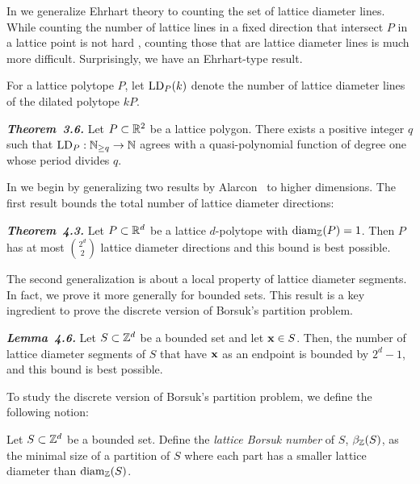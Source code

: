 In  we generalize Ehrhart theory to counting the set of lattice diameter lines. While counting the number of lattice lines in a fixed direction that intersect $P$ in a lattice point is not hard \cite{aebThesis}, counting those that are lattice diameter lines is much more difficult. Surprisingly, we have an Ehrhart-type result.

\begin{definition}\label{def:LD_P}
    For a lattice polytope $P$, let $\operatorname{LD}_P(k)$ denote the number of lattice diameter lines of the dilated polytope $kP$.
\end{definition}

\begin{manualthm}
    \emph{\textbf{Theorem~3.6.}} Let $P \subset \mathbb{R}^2$ be a lattice polygon. There exists a positive integer $q$ such that \mbox{$\operatorname{LD}_P: \mathbb{N}_{\geq q} \to \mathbb{N}$} agrees with a quasi-polynomial function of degree one whose period divides $q$.
\end{manualthm}

 In  we begin by generalizing two results by Alarcon~\cite{Alarcon_PhD} to higher dimensions. The first result bounds the total number of lattice diameter directions:

\begin{manualthm}\textbf{\emph{Theorem~4.3.}}
    Let $P\subset \mathbb{R}^d$ be a lattice $d$-polytope with $\operatorname{diam_{\mathbb{Z}}}(P)=1$. Then $P$ has at most $\binom{2^d}{2}$ lattice diameter directions and this bound is best possible.
\end{manualthm}

The second generalization is about a local property of lattice diameter segments. In fact, we prove it more generally for bounded sets. This result is a key ingredient to prove the discrete version of Borsuk's partition problem.

\begin{manualthm}\textbf{\emph{Lemma~4.6.}}
    Let $S\subset \mathbb{Z}^d$ be a bounded set and let $\mathbf{x} \in S$. Then, the number of lattice diameter segments of $S$ that have $\mathbf{x}$ as an endpoint is bounded by $2^d-1$, and this bound is best possible.
\end{manualthm}

To study the discrete version of Borsuk's partition problem, we define the following notion:

\begin{definition}
    Let $S \subset \mathbb{Z}^d$ be a bounded set. Define the \textit{lattice Borsuk number} of $S$, $\beta_{\mathbb{Z}}(S)$, as the minimal size of a partition of $S$ where each part has a smaller lattice diameter than $\operatorname{diam_{\mathbb{Z}}}(S)$.
\end{definition}


